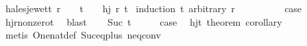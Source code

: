 \begin{isabellebody}
\endisatagproof
{\isafoldproof}%
%
\isadelimproof
\isanewline
%
\endisadelimproof
\isanewline
{}\isamarkupfalse%
\ hales{\isacharunderscore}{\kern0pt}jewett{\isacharcolon}{\kern0pt}\ {\isachardoublequoteopen}{\isasymnot}{\isacharparenleft}{\kern0pt}r\ {\isacharequal}{\kern0pt}\ {}\ {\isasymand}\ t\ {\isacharequal}{\kern0pt}\ {}{\isacharparenright}{\kern0pt}\ {\isasymLongrightarrow}\ hj\ r\ t{\isachardoublequoteclose}\isanewline
%
\isadelimproof
%
\endisadelimproof
%
\isatagproof
{}\isamarkupfalse%
\ {\isacharparenleft}{\kern0pt}induction\ t\ arbitrary{\isacharcolon}{\kern0pt}\ r{\isacharparenright}{\kern0pt}\isanewline
\ \ \isamarkupfalse%
\ {}\isanewline
\ \ \isamarkupfalse%
\ \isamarkupfalse%
\ {\isacharquery}{\kern0pt}case\ \isamarkupfalse%
\ hj{\isacharunderscore}{\kern0pt}r{\isacharunderscore}{\kern0pt}nonzero{\isacharunderscore}{\kern0pt}t{\isacharunderscore}{\kern0pt}{}\ \isamarkupfalse%
\ blast\isanewline
{}\isamarkupfalse%
\isanewline
\ \ \isamarkupfalse%
\ {\isacharparenleft}{\kern0pt}Suc\ t{\isacharparenright}{\kern0pt}\isanewline
\ \ \isamarkupfalse%
\ \isamarkupfalse%
\ {\isacharquery}{\kern0pt}case\ \isamarkupfalse%
\ hj{\isacharunderscore}{\kern0pt}t{\isacharunderscore}{\kern0pt}{}\ theorem{}\ corollary{}\ \isamarkupfalse%
\ {\isacharparenleft}{\kern0pt}metis\ One{\isacharunderscore}{\kern0pt}nat{\isacharunderscore}{\kern0pt}def\ Suc{\isacharunderscore}{\kern0pt}eq{\isacharunderscore}{\kern0pt}plus{}\ neq{}{\isacharunderscore}{\kern0pt}conv{\isacharparenright}{\kern0pt}\isanewline
{}\isamarkupfalse%
%
\endisatagproof
{\isafoldproof}%
%
\isadelimproof
\isanewline
%
\endisadelimproof
\isanewline
{}\isamarkupfalse%
\isanewline
%
\isadelimtheory
\isanewline
%
\endisadelimtheory
%
\isatagtheory
{}\isamarkupfalse%
%
\endisatagtheory
{\isafoldtheory}%
%
\isadelimtheory
%
\endisadelimtheory
%
\end{isabellebody}%
\endinput
